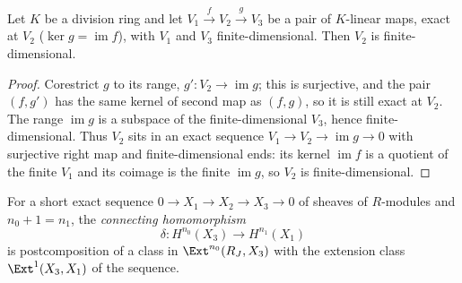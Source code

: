\begin{theorem}
  \label{thm:finiteDimensional_of_exact}
  \leanok
  Let \(K\) be a division ring and let \(V_1 \xrightarrow{f} V_2 \xrightarrow{g} V_3\) be a pair
  of \(K\)-linear maps, exact at \(V_2\) (\(\ker g = \operatorname{im} f\)), with \(V_1\) and
  \(V_3\) finite-dimensional. Then \(V_2\) is finite-dimensional.
\end{theorem}
\begin{proof}
  \leanok
  Corestrict \(g\) to its range, \(g' : V_2 \to \operatorname{im} g\); this is surjective, and the
  pair \((f, g')\) has the same kernel of second map as \((f, g)\), so it is still exact at
  \(V_2\). The range \(\operatorname{im} g\) is a subspace of the finite-dimensional \(V_3\), hence
  finite-dimensional. Thus \(V_2\) sits in an exact sequence
  \(V_1 \to V_2 \to \operatorname{im} g \to 0\) with surjective right map and finite-dimensional
  ends: its kernel \(\operatorname{im} f\) is a quotient of the finite \(V_1\) and its coimage is
  the finite \(\operatorname{im} g\), so \(V_2\) is finite-dimensional.
\end{proof}

\begin{definition}
  \label{def:HModule_delta}
  \leanok
  For a short exact sequence \(0 \to X_1 \to X_2 \to X_3 \to 0\) of sheaves of \(R\)-modules and
  \(n_0 + 1 = n_1\), the \emph{connecting homomorphism}
  \[
    \delta : H^{n_0}(X_3) \longrightarrow H^{n_1}(X_1)
  \]
  is postcomposition of a class in \(\Ext^{n_0}(R_J, X_3)\) with the extension class
  \(\Ext^1(X_3, X_1)\) of the sequence.
\end{definition}

